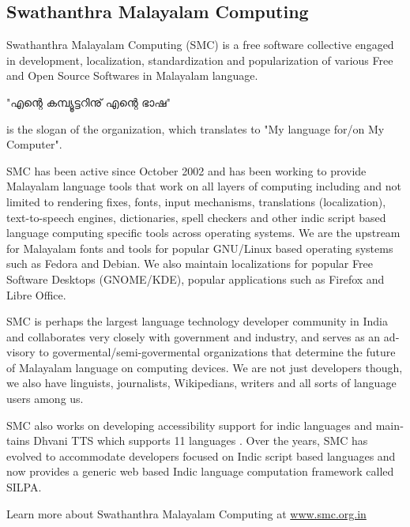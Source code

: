\begin{english}
\section*{Swathanthra Malayalam Computing}

Swathanthra Malayalam Computing (SMC) is a free software collective engaged in development, localization, standardization and popularization of various Free and Open Source Softwares in Malayalam language.\end{english} "എന്റെ കമ്പ്യൂട്ടറിനു് എന്റെ ഭാഷ" \begin{english} is the slogan of the organization, which translates to "My language for/on My Computer".

SMC has been active since October 2002 and has been working to provide Malayalam language tools that work on all layers of computing including and not limited to rendering fixes, fonts, input mechanisms, translations (localization), text-to-speech engines, dictionaries, spell checkers and other indic script based language computing specific tools across operating systems. We are the upstream for Malayalam fonts and tools for popular GNU/Linux based operating systems such as Fedora and Debian. We also maintain localizations for popular Free Software Desktops (GNOME/KDE), popular applications such as Firefox and Libre Office.

SMC is perhaps the largest language technology developer community in India and collaborates very closely with government and industry, and serves as an advisory to govermental/semi-govermental organizations that determine the future of Malayalam language on computing devices. We are not just developers though, we also have linguists, journalists, Wikipedians, writers and all sorts of language users among us.

SMC also works on developing accessibility support for indic languages and maintains Dhvani TTS which supports 11 languages . Over the years, SMC has evolved to accommodate developers focused on Indic script based languages and now provides a generic web based Indic language computation framework called SILPA.

Learn more about Swathanthra Malayalam Computing at \mbox{\url{www.smc.org.in}}
\end{english}
